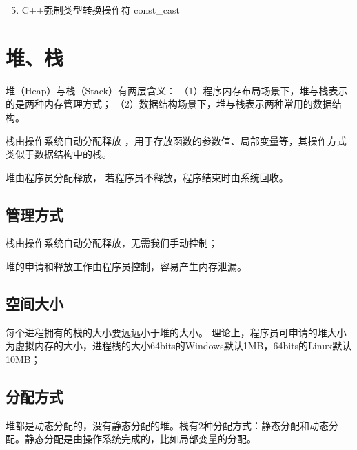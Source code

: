 \documentclass[letterpaper,10pt,english]{sphinxmanual}
\begin{document}
\begin{quote}


\end{quote}
\begin{enumerate}
\setcounter{enumi}{4}
\item {} 
C++强制类型转换操作符 const\_cast

\end{enumerate}
\begin{quote}

\end{quote}


\section{堆、栈}
\label{\detokenize{cpp/11_heapStack::doc}}\label{\detokenize{cpp/11_heapStack:id1}}
堆（Heap）与栈（Stack）有两层含义：
（1）程序内存布局场景下，堆与栈表示的是两种内存管理方式；
（2）数据结构场景下，堆与栈表示两种常用的数据结构。

栈由操作系统自动分配释放 ，用于存放函数的参数值、局部变量等，其操作方式类似于数据结构中的栈。

堆由程序员分配释放， 若程序员不释放，程序结束时由系统回收。


\subsection{管理方式}
\label{\detokenize{cpp/11_heapStack:id2}}
栈由操作系统自动分配释放，无需我们手动控制；

堆的申请和释放工作由程序员控制，容易产生内存泄漏。


\subsection{空间大小}
\label{\detokenize{cpp/11_heapStack:id3}}
每个进程拥有的栈的大小要远远小于堆的大小。
理论上，程序员可申请的堆大小为虚拟内存的大小，进程栈的大小64bits的Windows默认1MB，64bits的Linux默认10MB；


\subsection{分配方式}
\label{\detokenize{cpp/11_heapStack:id4}}
堆都是动态分配的，没有静态分配的堆。栈有2种分配方式：静态分配和动态分配。静态分配是由操作系统完成的，比如局部变量的分配。
\end{document}
